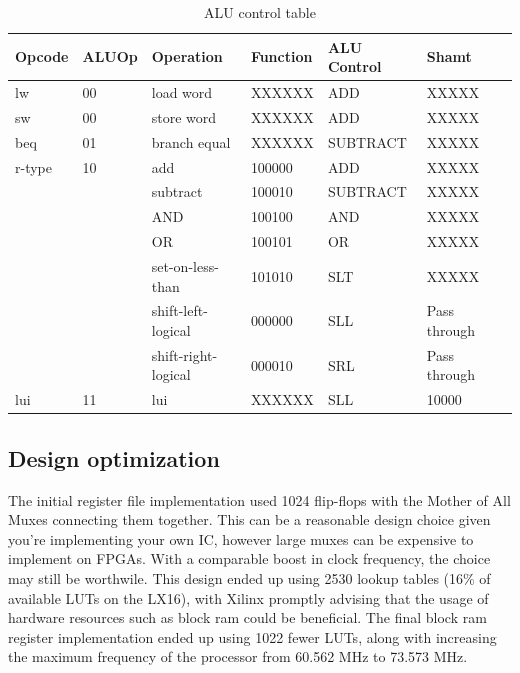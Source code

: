 \begin{table}[ht!]
    \begin{tabular}{|l|l|l|l|l|l|l|}
    \hline
    Opcode & ALUOp & Operation           & Function & ALU Control & Shamt   \\ \hline
    lw     & 00    & load word           & XXXXXX   & ADD         & XXXXX \\ \hline
    sw     & 00    & store word          & XXXXXX   & ADD         & XXXXX \\ \hline
    beq    & 01    & branch equal        & XXXXXX   & SUBTRACT    & XXXXX \\ \hline
    r-type & 10    & add                 & 100000   & ADD         & XXXXX \\ \cline{3-6}
           &       & subtract            & 100010   & SUBTRACT    & XXXXX \\ \cline{3-6}
           &       & AND                 & 100100   & AND         & XXXXX \\ \cline{3-6}
           &       & OR                  & 100101   & OR          & XXXXX \\ \cline{3-6}
           &       & set-on-less-than    & 101010   & SLT         & XXXXX \\ \cline{3-6}
           &       & shift-left-logical  & 000000   & SLL         & Pass through \\ \cline{3-6}
           &       & shift-right-logical & 000010   & SRL         & Pass through \\ \hline
    lui    & 11    & lui                 & XXXXXX   & SLL         & 10000 \\ \hline
    \end{tabular}
    \caption{ALU control table}
    \label{tab:alu-control}
\end{table}

\subsection{Design optimization}

The initial register file implementation used 1024 flip-flops with the Mother of All Muxes connecting them together.
This can be a reasonable design choice given you're implementing your own IC, however large muxes can be expensive to implement on FPGAs.
With a comparable boost in clock frequency, the choice may still be worthwile.
This design ended up using 2530 lookup tables (16\% of available LUTs on the LX16), with Xilinx promptly advising that the usage of hardware resources such as block ram could be beneficial.
The final block ram register implementation ended up using 1022 fewer LUTs, along with increasing the maximum frequency of the processor from 60.562 MHz to 73.573 MHz.


